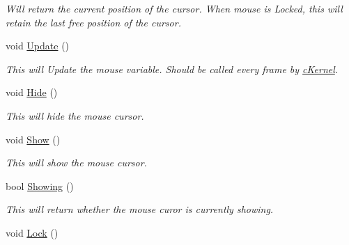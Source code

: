 \begin{DoxyCompactItemize}
\begin{DoxyCompactList}\small\item\em Will return the current position of the cursor. When mouse is Locked, this will retain the last free position of the cursor. \end{DoxyCompactList}\item 
\hypertarget{classc_mouse_a558d192a5c2df1352d1b8de7275a9359}{
void \hyperlink{classc_mouse_a558d192a5c2df1352d1b8de7275a9359}{Update} ()}
\label{classc_mouse_a558d192a5c2df1352d1b8de7275a9359}

\begin{DoxyCompactList}\small\item\em This will Update the mouse variable. Should be called every frame by \hyperlink{classc_kernel}{cKernel}. \end{DoxyCompactList}\item 
\hypertarget{classc_mouse_a65b10c846c3e0ac6d77f398095c66164}{
void \hyperlink{classc_mouse_a65b10c846c3e0ac6d77f398095c66164}{Hide} ()}
\label{classc_mouse_a65b10c846c3e0ac6d77f398095c66164}

\begin{DoxyCompactList}\small\item\em This will hide the mouse cursor. \end{DoxyCompactList}\item 
\hypertarget{classc_mouse_a54300b8fe1f8c5c0ec88e7ae26eff0e0}{
void \hyperlink{classc_mouse_a54300b8fe1f8c5c0ec88e7ae26eff0e0}{Show} ()}
\label{classc_mouse_a54300b8fe1f8c5c0ec88e7ae26eff0e0}

\begin{DoxyCompactList}\small\item\em This will show the mouse cursor. \end{DoxyCompactList}\item 
\hypertarget{classc_mouse_a2653fbbb900967fda6eccf933019ab8d}{
bool \hyperlink{classc_mouse_a2653fbbb900967fda6eccf933019ab8d}{Showing} ()}
\label{classc_mouse_a2653fbbb900967fda6eccf933019ab8d}

\begin{DoxyCompactList}\small\item\em This will return whether the mouse curor is currently showing. \end{DoxyCompactList}\item 
\hypertarget{classc_mouse_abef74e9066d916ec62daf4a440dbbe58}{
void \hyperlink{classc_mouse_abef74e9066d916ec62daf4a440dbbe58}{Lock} ()}
\label{classc_mouse_abef74e9066d916ec62daf4a440dbbe58}


\end{DoxyCompactItemize}

